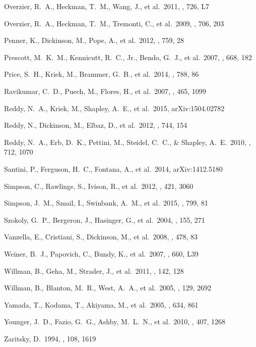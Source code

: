 \documentclass[preprint]{aastex}
\begin{document}
\begin{thebibliography}
 Overzier, R.~A., 
Heckman, T.~M., Wang, J., et al.\ 2011, \apjl, 726, L7 

 Overzier, R.~A., 
Heckman, T.~M., Tremonti, C., et al.\ 2009, \apj, 706, 203

 Penner, K., Dickinson, 
M., Pope, A., et al.\ 2012, \apj, 759, 28 

 Prescott, M.~K.~M., 
Kennicutt, R.~C., Jr., Bendo, G.~J., et al.\ 2007, \apj, 668, 182

 Price, S.~H., Kriek, M., 
Brammer, G.~B., et al.\ 2014, \apj, 788, 86

 Ravikumar, C.~D., Puech, M.,
Flores, H., et al.\ 2007, \aap, 465, 1099

 Reddy, N.~A., Kriek, M., 
Shapley, A.~E., et al.\ 2015, arXiv:1504.02782

 Reddy, N., Dickinson, M.,
Elbaz, D., et al.\ 2012, \apj, 744, 154 

 Reddy, N.~A., Erb, D.~K.,
Pettini, M., Steidel, C.~C., \& Shapley, A.~E.\ 2010, \apj, 712, 1070

 Santini, P., Ferguson, 
H.~C., Fontana, A., et al.\ 2014, arXiv:1412.5180

 Simpson, C., Rawlings, 
S., Ivison, R., et al.\ 2012, \mnras, 421, 3060

 Simpson, J.~M., Smail, 
I., Swinbank, A.~M., et al.\ 2015, \apj, 799, 81

 Szokoly, G.~P., 
Bergeron, J., Hasinger, G., et al.\ 2004, \apjs, 155, 271

 Vanzella, E., Cristiani, S.,
Dickinson, M., et al.\ 2008, \aap, 478, 83

 Weiner, B.~J., Papovich, 
C., Bundy, K., et al.\ 2007, \apjl, 660, L39

 Willman, B., Geha, M., 
Strader, J., et al.\ 2011, \aj, 142, 128 

 Willman, B., Blanton, 
M.~R., West, A.~A., et al.\ 2005, \aj, 129, 2692

 Yamada, T., Kodama, T., 
Akiyama, M., et al.\ 2005, \apj, 634, 861

 Younger, J.~D., Fazio, 
G.~G., Ashby, M.~L.~N., et al.\ 2010, \mnras, 407, 1268

 Zaritsky, D.\ 1994, \aj, 108, 
1619

\end{thebibliography}
\end{document}
